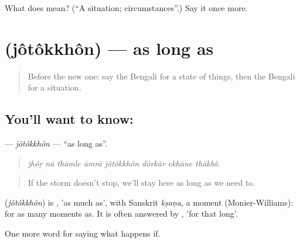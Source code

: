 \begin{tcolorbox}[breakable,colback=teal!4,colframe=teal!35!black,title={Before you move on}]
What does  mean? (\textquotedblleft{}A situation; circumstances\textquotedblright{}.) Say it once more.
\end{tcolorbox}
\section[\texorpdfstring{\bn{যতক্ষণ} (jôtôkkhôn)}{যতক্ষণ (jôtôkkhôn)}]{ (jôtôkkhôn) — as long as}

\label{lesson:BN-C368-jotokkhon}



\begin{quote}
Before the new one: say the Bengali for a state of things, then the Bengali for a situation.
\end{quote}

\subsection*{You'll want to know: }
\textbf{} — \emph{jôtôkkhôn} — \textquotedblleft{}as long as\textquotedblright{}.

\begin{quote}
       
\end{quote}

\begin{quote}
\emph{jhôṛ nā thāmle āmrā jôtôkkhôn dôrkār ekhāne thākbô.}
\end{quote}

\begin{quote}
If the storm doesn't stop, we'll stay here as long as we need to.
\end{quote}

\begin{cousinweb}
\textbf{} (\emph{jôtôkkhôn}) is , 'as much as', with Sanskrit \emph{kṣaṇa}, a moment (Monier-Williams): for as many moments as. It is often answered by , 'for that long'.
\end{cousinweb}

\begin{grammarlens}[title={What you've built}]
One more word for saying what happens if.
\end{grammarlens}

